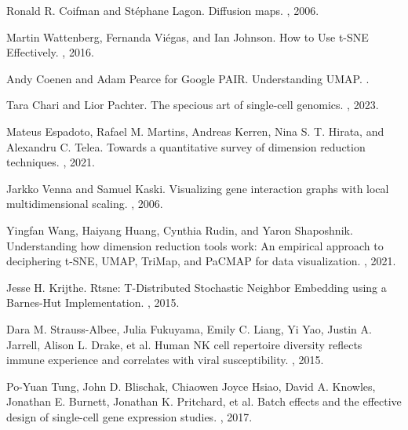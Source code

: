 \documentclass{article}
\begin{document}
\begin{thebibliography}{10}
Ronald R. Coifman and St\'ephane Lagon.
\newblock Diffusion maps.
, 2006.

Martin Wattenberg, Fernanda Vi\'egas, and Ian Johnson.
\newblock How to Use t-SNE Effectively.
, 2016.

Andy Coenen and Adam Pearce for Google PAIR.
\newblock Understanding UMAP.
.

Tara Chari and Lior Pachter.
\newblock The specious art of single-cell genomics.
,  2023.

Mateus Espadoto, Rafael M. Martins, Andreas Kerren, Nina S. T. Hirata, and Alexandru C. Telea.
\newblock Towards a quantitative survey of dimension reduction techniques.
, 2021.

Jarkko Venna and Samuel Kaski.
\newblock Visualizing gene interaction graphs with local multidimensional scaling.
, 2006.

Yingfan Wang, Haiyang Huang, Cynthia Rudin, and Yaron Shaposhnik.
\newblock Understanding how dimension reduction tools work: An empirical approach to deciphering t-SNE, UMAP, TriMap, and PaCMAP for data visualization.
, 2021.

Jesse H. Krijthe.
\newblock Rtsne: T-Distributed Stochastic Neighbor Embedding using a Barnes-Hut Implementation.
, 2015.

Dara M. Strauss-Albee, Julia Fukuyama, Emily C. Liang, Yi Yao, Justin A. Jarrell, Alison L. Drake, et al.
\newblock Human NK cell repertoire diversity reflects immune experience and correlates with viral susceptibility.
, 2015.

 Po-Yuan Tung, John D. Blischak, Chiaowen Joyce Hsiao, David A. Knowles, Jonathan E. Burnett, Jonathan K. Pritchard, et al.
 \newblock Batch effects and the effective design of single-cell gene expression studies.
 , 2017.


\end{thebibliography}
\end{document}
